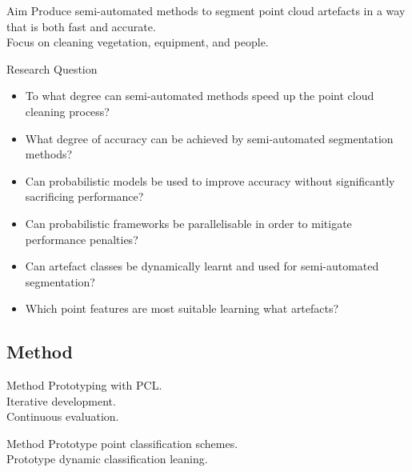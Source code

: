 \documentclass{beamer}
\begin{document}
\begin{frame}{Aim}
Produce semi-automated methods to segment point cloud artefacts in a way that is both fast and accurate.\\

\vspace{\baselineskip}
Focus on cleaning vegetation, equipment, and people.

\end{frame}

\begin{frame}{Research Question}

\begin{itemize}
\item To what degree can semi-automated methods speed up the point cloud cleaning process?
\item What degree of accuracy can be achieved by semi-automated segmentation methods?
\item Can probabilistic models be used to improve accuracy without significantly sacrificing performance?
\item Can probabilistic frameworks be parallelisable in order to mitigate performance penalties?  
\item Can artefact classes be dynamically learnt and used for semi-automated segmentation?
\item Which point features are most suitable learning what artefacts?
\end{itemize}

\end{frame}

\subsection{Method}

\begin{frame}{Method}
  Prototyping with PCL.\\
  Iterative development.\\
  Continuous evaluation.\\
\end{frame}

\begin{frame}{Method}
  Prototype point classification schemes.\\
  Prototype dynamic classification leaning.\\
\end{frame}
\end{document}
